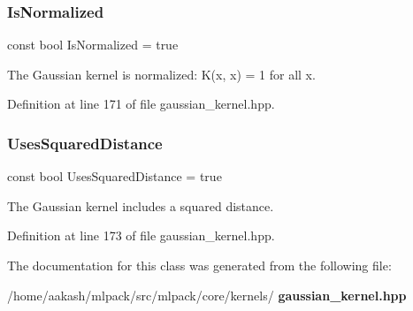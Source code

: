 \subsubsection{Is\+Normalized}
{\footnotesize\ttfamily const bool Is\+Normalized = true\hspace{0.3cm}{\ttfamily [static]}}



The Gaussian kernel is normalized\+: K(x, x) = 1 for all x. 



Definition at line 171 of file gaussian\+\_\+kernel.\+hpp.

\mbox{\label{classmlpack_1_1kernel_1_1KernelTraits_3_01GaussianKernel_01_4_a12fc177e124e69c8efbac5b08e5c5196}} 
\subsubsection{Uses\+Squared\+Distance}
{\footnotesize\ttfamily const bool Uses\+Squared\+Distance = true\hspace{0.3cm}{\ttfamily [static]}}



The Gaussian kernel includes a squared distance. 



Definition at line 173 of file gaussian\+\_\+kernel.\+hpp.



The documentation for this class was generated from the following file\+:\begin{DoxyCompactItemize}
\item 
/home/aakash/mlpack/src/mlpack/core/kernels/\textbf{ gaussian\+\_\+kernel.\+hpp}\end{DoxyCompactItemize}
